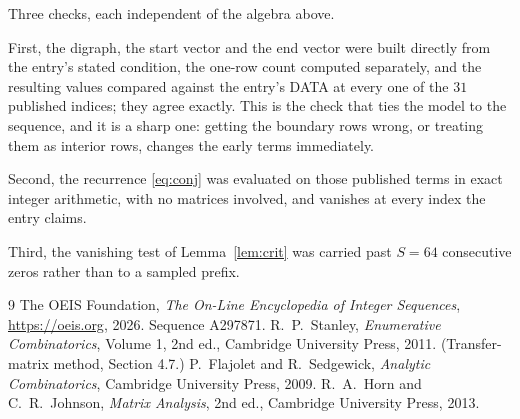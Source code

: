 \documentclass[11pt,a4paper]{article}
\theoremstyle{plain}
\theoremstyle{definition}
\begin{document}
Three checks, each independent of the algebra above.

First, the digraph, the start vector and the end vector were built directly from the
entry's stated condition, the one-row count computed separately, and the resulting values
compared against the entry's DATA at every one of the $31$ published indices; they
agree exactly. This is the check that ties the model to the sequence, and it is a sharp one:
getting the boundary rows wrong, or treating them as interior rows, changes the early terms
immediately.

Second, the recurrence \eqref{eq:conj} was evaluated on those published terms in exact
integer arithmetic, with no matrices involved, and vanishes at every index the entry claims.

Third, the vanishing test of Lemma~\ref{lem:crit} was carried past $S=64$ consecutive
zeros rather than to a sampled prefix.

\begin{thebibliography}{9}
 The OEIS Foundation, \emph{The On-Line Encyclopedia of Integer
Sequences}, \url{https://oeis.org}, 2026. Sequence A297871.
 R.~P.~Stanley, \emph{Enumerative Combinatorics}, Volume 1, 2nd ed.,
Cambridge University Press, 2011. (Transfer-matrix method, Section 4.7.)
 P.~Flajolet and R.~Sedgewick, \emph{Analytic Combinatorics}, Cambridge
University Press, 2009.
 R.~A.~Horn and C.~R.~Johnson, \emph{Matrix Analysis}, 2nd ed., Cambridge
University Press, 2013.
\end{thebibliography}
\end{document}
